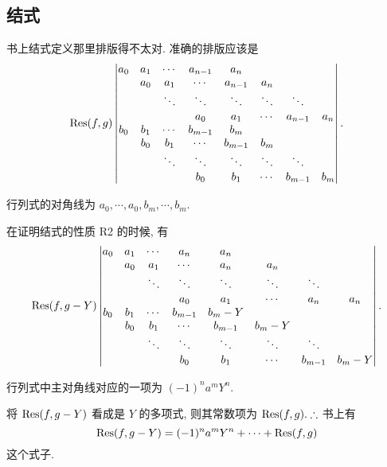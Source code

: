 \documentclass[UTF8]{ctexart}
\begin{document}
\subsection{结式}
书上结式定义那里排版得不太对. 准确的排版应该是
\[\operatorname{Res} (f,g)\begin{vmatrix}
    a_0 & a_1 & \cdots & a_{n-1} & a_n \\
    & a_0 & a_1 & \cdots & a_{n-1} & a_n \\
    && \ddots & \ddots & \ddots & \ddots & \ddots \\
    &&& a_0 & a_1 & \cdots & a_{n-1} & a_n \\
    b_0 & b_1 & \cdots & b_{m-1} & b_m \\
    & b_0 & b_1 & \cdots & b_{m-1} & b_m \\
    && \ddots & \ddots & \ddots & \ddots & \ddots \\
    &&& b_0 & b_1 & \cdots & b_{m-1} & b_m \\
\end{vmatrix}.\]

行列式的对角线为 $a_0,\cdots,a_0,b_m,\cdots,b_m$.

在证明结式的性质 R2 的时候, 有
\[\operatorname{Res} (f,g-Y)\begin{vmatrix}
    a_0 & a_1 & \cdots & a_n & a_n \\
    & a_0 & a_1 & \cdots & a_n & a_n \\
    && \ddots & \ddots & \ddots & \ddots & \ddots \\
    &&& a_0 & a_1 & \cdots & a_n & a_n \\
    b_0 & b_1 & \cdots & b_{m-1} & b_m-Y \\
    & b_0 & b_1 & \cdots & b_{m-1} & b_m-Y \\
    && \ddots & \ddots & \ddots & \ddots & \ddots \\
    &&& b_0 & b_1 & \cdots & b_{m-1} & b_m-Y \\
\end{vmatrix}.\]

行列式中主对角线对应的一项为 $(-1)^na^mY^n$.

将 $\operatorname{Res} (f,g-Y)$ 看成是 $Y$ 的多项式, 则其常数项为 $\operatorname{Res} (f,g).\therefore$ 书上有
\[\operatorname{Res} (f,g-Y)=(-1)^na^mY^n+\cdots+\operatorname{Res} (f,g)\]
这个式子.
\end{document}
